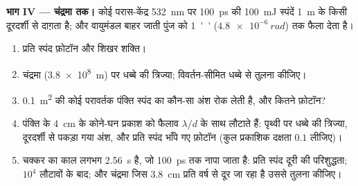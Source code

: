 \begin{problem}
\textbf{भाग IV --- चंद्रमा तक।}
कोई परास-केंद्र \qty{532}{nm} पर \qty{100}{ps} की \qty{100}{mJ} स्पंदें
\qty{1}{m} के किसी दूरदर्शी से दाग़ता है; और वायुमंडल बाहर जाती पुंज को
\qty{1}{''} ($\qty{4.8e-6}{rad}$) तक फैला देता है।
\begin{enumerate}[resume]
  \item प्रति स्पंद फ़ोटॉन और शिखर शक्ति।
  \item चंद्रमा (\qty{3.8e8}{m}) पर धब्बे की त्रिज्या;
        विवर्तन-सीमित धब्बे से तुलना कीजिए।
  \item \qty{0.1}{m^2} की कोई परावर्तक पंक्ति स्पंद का कौन-सा अंश
        रोक लेती है, और कितने फ़ोटॉन?
  \item पंक्ति के \qty{4}{cm} के कोने-घन प्रकाश को फैलाव
        $\lambda/d$ के साथ लौटाते हैं: पृथ्वी पर धब्बे की त्रिज्या, दूरदर्शी से पकड़ा गया
        अंश, और प्रति स्पंद भाँपे गए फ़ोटॉन (कुल प्रकाशिक
        दक्षता $0.1$ लीजिए)।
  \item चक्कर का काल लगभग \qty{2.56}{s} है, जो \qty{100}{ps} तक नापा जाता है:
        प्रति स्पंद दूरी की परिशुद्धता; $10^4$ लौटावों के
        बाद; और चंद्रमा जिस \qty{3.8}{cm} प्रति वर्ष से दूर जा रहा है उससे तुलना कीजिए।
\end{enumerate}
\end{problem}
